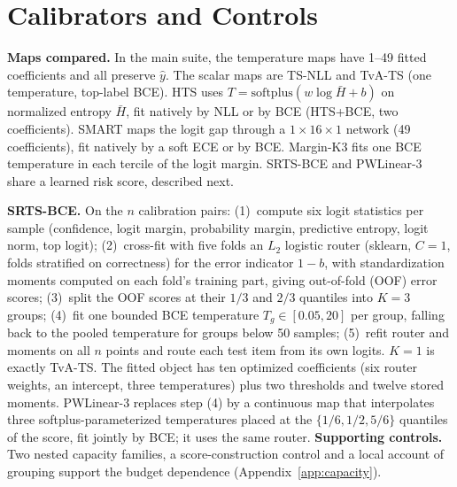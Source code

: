 \documentclass[sigconf,anonymous,review]{acmart}
\begin{document}
\section{Calibrators and Controls}
\label{sec:method}
\textbf{Maps compared.} In the main suite, the temperature maps have 1--49
fitted coefficients and all preserve $\hat y$. The scalar maps are TS-NLL and TvA-TS (one
temperature, top-label BCE). HTS uses $T=\mathrm{softplus}(w\log\bar
H+b)$ on normalized entropy $\bar H$, fit natively by NLL or by BCE
(HTS+BCE, two coefficients). SMART maps the logit gap through a
$1{\times}16{\times}1$ network (49 coefficients), fit natively by a soft
ECE or by BCE. Margin-K3 fits one BCE temperature in each tercile of the
logit margin. SRTS-BCE and PWLinear-3 share a learned risk score,
described next.

\textbf{SRTS-BCE.} On the $n$ calibration pairs: (1)~compute six logit
statistics per sample (confidence, logit margin, probability margin,
predictive entropy, logit norm, top logit); (2)~cross-fit with five folds
an $L_2$ logistic router (sklearn, $C{=}1$, folds stratified on
correctness) for the error indicator $1-b$, with standardization moments
computed on each fold's training part, giving out-of-fold (OOF) error
scores; (3)~split the OOF scores at their $1/3$ and $2/3$ quantiles into
$K{=}3$ groups; (4)~fit one bounded BCE temperature $T_g\in[0.05,20]$ per
group, falling back to the pooled temperature for groups below 50
samples; (5)~refit router and moments on all $n$ points and route each
test item from its own logits. $K{=}1$ is exactly TvA-TS. The fitted
object has ten optimized coefficients (six router weights, an intercept,
three temperatures) plus two thresholds and twelve stored moments.
PWLinear-3 replaces step (4) by a continuous map that interpolates three
softplus-parameterized temperatures placed at the $\{1/6,1/2,5/6\}$
quantiles of the score, fit jointly by BCE; it uses the same router.
\textbf{Supporting controls.} Two nested capacity families, a
score-construction control and a local account of grouping support the
budget dependence (Appendix~\ref{app:capacity}).
\end{document}
